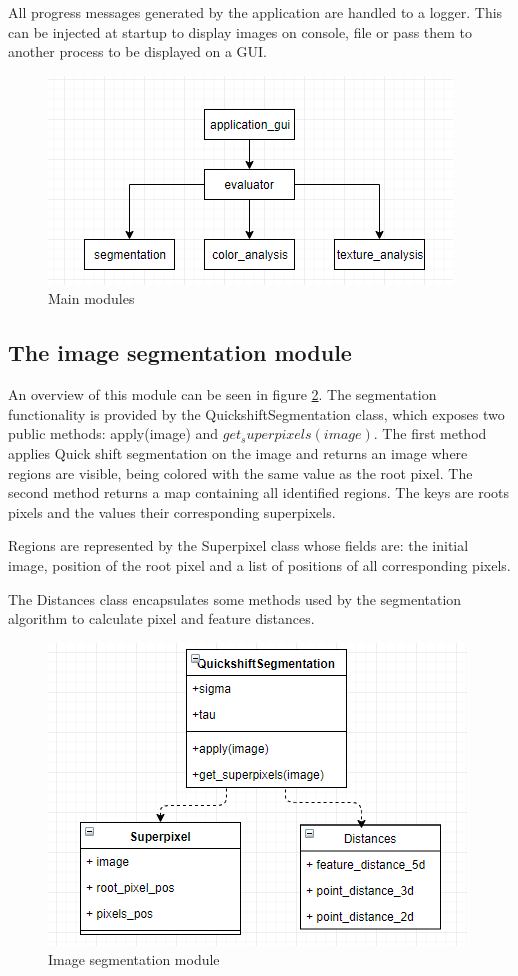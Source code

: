 \documentclass[12pt]{report}
\begin{document}
	All progress messages generated by the application are handled to a logger. This can be injected at startup to display images on console, file or pass them to another process to be displayed on a GUI.
	
	\begin{figure}[h!]
		\centering
		\includegraphics[]{design/main_modules.png}
		\caption{Main modules}
		\label{fig:main_modules}
	\end{figure}

	\subsection{The image segmentation module}
	An overview of this module can be seen in figure \ref{fig:image_segmentation}. The segmentation functionality is provided by the QuickshiftSegmentation class, which exposes two public methods: apply(image) and $get_superpixels(image)$. The first method applies Quick shift segmentation on the image and returns an image where regions are visible, being colored with the same value as the root pixel. The second method returns a map containing all identified regions. The keys are roots pixels and the values their corresponding superpixels. 
	
	Regions are represented by the Superpixel class whose fields are: the initial image, position of the root pixel and a list of positions of all corresponding pixels.
	
	The Distances class encapsulates some methods used by the segmentation algorithm to calculate pixel and feature distances.
	
	\begin{figure}[h!]
		\centering
		\includegraphics[]{design/image_segmentation.png}
		\caption{Image segmentation module}
		\label{fig:image_segmentation}
	\end{figure}
\end{document}

